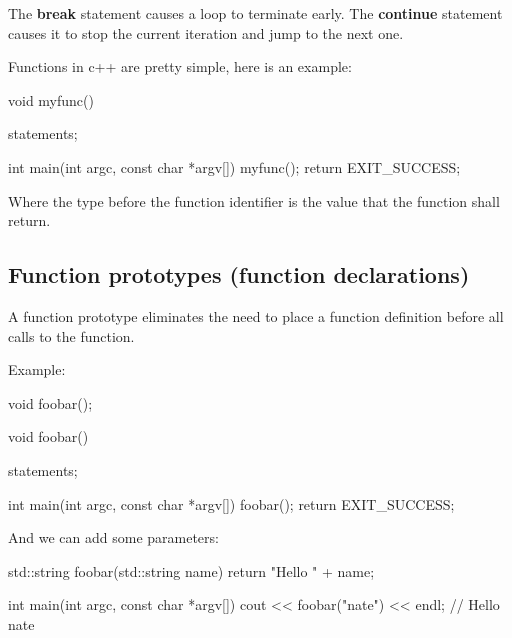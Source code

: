 \documentclass{report}
\begin{document}
    \pagebreak
    \bigbreak \noindent 
    \begin{concept}
 The \textbf{break} statement causes a loop to terminate early. The \textbf{continue} statement causes it to stop the current iteration and jump to the next one.
	\end{concept}

    \pagebreak
    \bigbreak \noindent 
    Functions in c++ are pretty simple, here is an example:
    \bigbreak \noindent 
    
    \begin{cppcode}
void myfunc() {
    statements;

}
int main(int argc, const char *argv[]){ myfunc(); return EXIT_SUCCESS; }
    \end{cppcode}
    
    \bigbreak \noindent 
    Where the type before the function identifier is the value that the function shall return.
    \bigbreak \noindent 
    \subsection{Function prototypes (function declarations)}
    \bigbreak \noindent 
    \begin{concept}
 A function prototype eliminates the need to place a function definition before all calls to the function.
	\end{concept}
    \bigbreak \noindent 
    Example:
    \bigbreak \noindent 
    
    \begin{cppcode}
void foobar();

void foobar() {
    statements;

}
int main(int argc, const char *argv[]){ foobar(); return EXIT_SUCCESS; }
    \end{cppcode}
    
    \bigbreak \noindent 
    
    \bigbreak \noindent 
    And we can add some parameters:
    \bigbreak \noindent 
    
    \begin{cppcode}
std::string foobar(std::string name) {
    return "Hello " + name;
}  

int main(int argc, const char *argv[]){ cout << foobar("nate") << endl; } // Hello nate 
    \end{cppcode}
    
\end{document}
